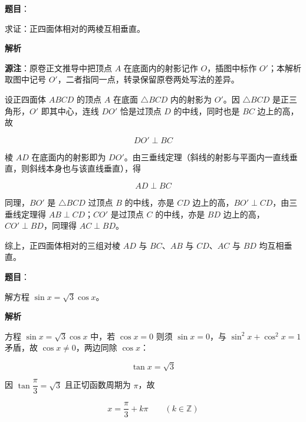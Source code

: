 \begin{answer}

\textbf{题目}：

求证：正四面体相对的两棱互相垂直。
\nopagebreak[4]
\begin{center}\end{center}
\nopagebreak[4]
\textbf{解析}
\nopagebreak[4]
\begin{center}\end{center}
\nopagebreak[4]
\begin{gktip}
\textbf{源注}：原卷正文推导中把顶点 $A$ 在底面内的射影记作 $O$，插图中标作 $O'$；本解析取图中记号 $O'$，二者指同一点，转录保留原卷两处写法的差异。
\end{gktip}

设正四面体 $ABCD$ 的顶点 $A$ 在底面 $\triangle BCD$ 内的射影为 $O'$。因 $\triangle BCD$ 是正三角形，$O'$ 即其中心，连线 $DO'$ 恰是过顶点 $D$ 的中线，同时也是 $BC$ 边上的高，故

\nopagebreak[4]
\[
DO'\perp BC
\]

棱 $AD$ 在底面内的射影即为 $DO'$。由三垂线定理（斜线的射影与平面内一直线垂直，则斜线本身也与该直线垂直），得

\nopagebreak[4]
\[
AD\perp BC
\]

同理，$BO'$ 是 $\triangle BCD$ 过顶点 $B$ 的中线，亦是 $CD$ 边上的高，$BO'\perp CD$，由三垂线定理得 $AB\perp CD$；$CO'$ 是过顶点 $C$ 的中线，亦是 $BD$ 边上的高，$CO'\perp BD$，同理得 $AC\perp BD$。

综上，正四面体相对的三组对棱 $AD$ 与 $BC$、$AB$ 与 $CD$、$AC$ 与 $BD$ 均互相垂直。


\end{answer}
\begin{answer}

\textbf{题目}：

解方程 $\sin x=\sqrt3\cos x$。

\textbf{解析}

方程 $\sin x=\sqrt3\cos x$ 中，若 $\cos x=0$ 则须 $\sin x=0$，与 $\sin^2x+\cos^2x=1$ 矛盾，故 $\cos x\ne0$，两边同除 $\cos x$：

\nopagebreak[4]
\[
\tan x=\sqrt3
\]

因 $\tan\dfrac\pi3=\sqrt3$ 且正切函数周期为 $\pi$，故

\nopagebreak[4]
\[
x=\frac\pi3+k\pi\qquad(k\in\mathbb Z)
\]


\end{answer}


